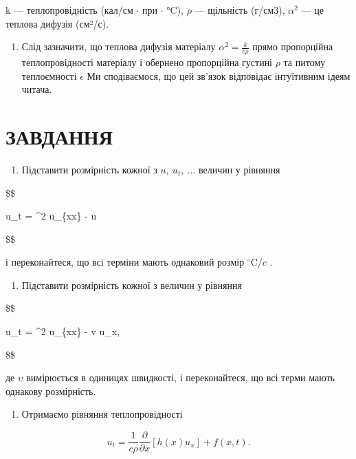 \documentclass[
  ukrainian,
]{article}
\providecommand{\tightlist}{%
  \setlength{\itemsep}{0pt}\setlength{\parskip}{0pt}}
\begin{document}
k --- теплопровідність (кал/см \(\cdot\) при \(\cdot\) °C), \(\rho\) ---
щільність (г/см3), \(\alpha^2\) --- це теплова дифузія (см²/с).

\begin{enumerate}
\def\labelenumi{\arabic{enumi}.}
\setcounter{enumi}{3}
\tightlist
\item
  Слід зазначити, що теплова дифузія матеріалу
  \(\alpha^2 = \frac{k}{\epsilon \rho}\) прямо пропорційна
  теплопровідності матеріалу і обернено пропорційна густині \(\rho\) та
  питому теплоємності \(\epsilon\) Ми сподіваємося, що цей зв'язок
  відповідає інтуїтивним ідеям читача.
\end{enumerate}

\section{ЗАВДАННЯ}\label{ux437ux430ux432ux434ux430ux43dux43dux44f-3}

\begin{enumerate}
\def\labelenumi{\arabic{enumi}.}
\tightlist
\item
  Підставити розмірність кожної з \(u,\ u_t,\ \dots\) величин у рівняння
\end{enumerate}

\$\$

u\_t = \alpha\^{}2 u\_\{xx\} - \beta u

\$\$

і переконайтеся, що всі терміни мають однаковий розмір
\({}^{\circ}\mathrm{C}/c\) .

\begin{enumerate}
\def\labelenumi{\arabic{enumi}.}
\setcounter{enumi}{1}
\tightlist
\item
  Підставити розмірність кожної з величин у рівняння
\end{enumerate}

\$\$

u\_t = \alpha\^{}2 u\_\{xx\} - v u\_x,

\$\$

де \(\upsilon\) вимірюється в одиницях швидкості, і переконайтеся, що
всі терми мають однакову розмірність.

\begin{enumerate}
\def\labelenumi{\arabic{enumi}.}
\setcounter{enumi}{2}
\tightlist
\item
  Отримаємо рівняння теплопровідності
\end{enumerate}

\[
u_t = \frac{1}{c\rho}\frac{\partial}{\partial x}\left[h(x)u_x\right] + f(x,t).
\]
\end{document}
